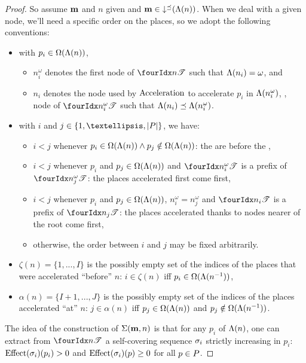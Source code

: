 \begin{proof}
  So assume $\mathbf{m}$ and $n$ given and $\mathbf{m} \in \operatorname{\downarrow^\preceq}(\operatorname{\Lambda}(n))$.
  When we deal with a given node, we'll need a specific order on the places, so we adopt the following conventions:
  \begin{itemize}
    \item with $p_i \in \operatorname{\Omega}(\operatorname{\Lambda}(n))$,
      \begin{itemize}
        \item $n^\omega_i$ denotes the first node of $\treepath{n}$ such that $\operatorname{\Lambda}(n_i) = \omega$, and
        \item $n_i$ denotes the node used by $\operatorname{Acceleration}$ to accelerate $p_i$ in $\operatorname{\Lambda}(n^\omega_i)$, ,  node of $\treepath{n^\omega_i}$ such that $\operatorname{\Lambda}(n_i) \preceq \operatorname{\Lambda}(n^\omega_i)$.
      \end{itemize}
    \item with $i$ and $j \in \{1, …, \card{\places}\}$, we have:
      \begin{itemize}
        \item $i < j$ whenever $p_i \in \operatorname{\Omega}(\operatorname{\Lambda}(n)) \wedge p_j \notin \operatorname{\Omega}(\operatorname{\Lambda}(n))$:
          the \oplaces are before the \noplaces,
        \item $i < j$ whenever $p_i$ and $p_j \in \operatorname{\Omega}(\operatorname{\Lambda}(n))$ and $\treepath{n^\omega_i}$ is a prefix of $\treepath{n^\omega_j}$:
          the places accelerated first come first,
        \item $i < j$ whenever $p_i$ and $p_j \in \operatorname{\Omega}(\operatorname{\Lambda}(n))$, $n^\omega_i = n^\omega_j$ and $\treepath{n_i}$ is a prefix of $\treepath{n_j}$:
          the places accelerated thanks to nodes nearer of the root come first,
        \item otherwise, the order between $i$ and $j$ may be fixed arbitrarily.
      \end{itemize}
    \item $\zeta(n) = \{1, ..., I\}$ is the possibly empty set of the indices of the places that were accelerated ``before'' $n$: $i \in \zeta(n)$ iff $p_i \in \operatorname{\Omega}(\operatorname{\Lambda}(n^{-1}))$,
    \item $\alpha(n) = \{I+1, ..., J\}$ is the possibly empty set of the indices of the places accelerated ``at'' $n$: $j \in \alpha(n)$ iff $p_j \in \operatorname{\Omega}(\operatorname{\Lambda}(n))$ and $p_j \notin \operatorname{\Omega}(\operatorname{\Lambda}(n^{-1}))$.
  \end{itemize}

  The idea of the construction of $\Sigma(\mathbf{m}, n)$ is that for any \oplace $p_i$ of $\operatorname{\Lambda}(n)$, one can extract from $\treepath{n}$ a self-covering sequence $\seqt_i$ strictly increasing in $p_i$:
  $\effect{\seqt_i}(p_i) > 0$ and $\effect{\seqt_i}(p) \geq 0$ for all $p \in P$.


\end{proof}
